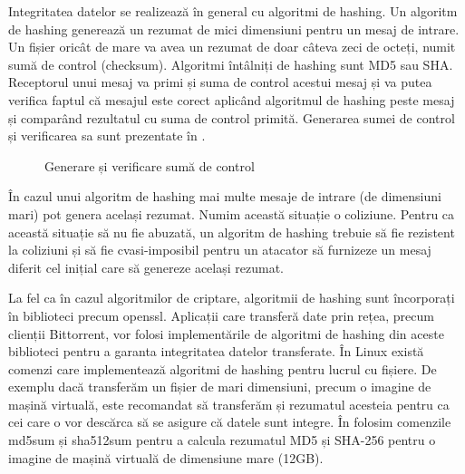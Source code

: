 Integritatea datelor se realizează în general cu algoritmi de hashing. Un algoritm de hashing generează un rezumat de mici dimensiuni pentru un mesaj de intrare. Un fișier oricât de mare va avea un rezumat de doar câteva zeci de octeți, numit sumă de control (checksum). Algoritmi întâlniți de hashing sunt MD5 sau SHA. Receptorul unui mesaj va primi și suma de control acestui mesaj și va putea verifica faptul că mesajul este corect aplicând algoritmul de hashing peste mesaj și comparând rezultatul cu suma de control primită. Generarea sumei de control și verificarea sa sunt prezentate în .

\begin{figure}[htbp]
  \centering
  \def\svgwidth{\columnwidth}
  
  \caption{Generare și verificare sumă de control}
  \label{fig:sec:checksum}
\end{figure}

În cazul unui algoritm de hashing mai multe mesaje de intrare (de dimensiuni mari) pot genera același rezumat. Numim această situație o coliziune. Pentru ca această situație să nu fie abuzată, un algoritm de hashing trebuie să fie rezistent la coliziuni și să fie cvasi-imposibil pentru un atacator să furnizeze un mesaj diferit cel inițial care să genereze același rezumat.

La fel ca în cazul algoritmilor de criptare, algoritmii de hashing sunt încorporați în biblioteci precum openssl. Aplicații care transferă date prin rețea, precum clienții Bittorrent, vor folosi implementările de algoritmi de hashing din aceste biblioteci pentru a garanta integritatea datelor transferate. În Linux există comenzi care implementează algoritmi de hashing pentru lucrul cu fișiere. De exemplu dacă transferăm un fișier de mari dimensiuni, precum o imagine de mașină virtuală, este recomandat să transferăm și rezumatul acesteia pentru ca cei care o vor descărca să se asigure că datele sunt integre. În  folosim comenzile md5sum și sha512sum pentru a calcula rezumatul MD5 și SHA-256 pentru o imagine de mașină virtuală de dimensiune mare (12GB).


